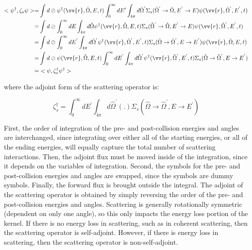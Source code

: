 \documentclass[10pt]{article}
\begin{document}
\begin{flushleft}
\begin{enumerate}
\begin{equation}
\begin{aligned}
<\psi^\dagger,\zeta_s\psi>=& \int d\oslash\psi^\dagger(\vv{r},\hat{\Omega},E,t)\int_0^\infty dE'\int_{4\pi}d\hat{\Omega}^{'}\Sigma_s(\hat{\Omega}^{'}\rightarrow\hat{\Omega}, E^{'}\rightarrow E)\psi(\vv{r},\hat{\Omega}^{'},E^{'},t)\\
=& \int d\oslash\int_0^\infty dE\int_{4\pi}d\hat{\Omega}\psi^\dagger(\vv{r},\hat{\Omega},E,t)\Sigma_s(\hat{\Omega}^{'}\rightarrow\hat{\Omega}, E^{'}\rightarrow E)\psi(\vv{r},\hat{\Omega}^{'},E^{'},t)\\
=& \int d\oslash\int_0^\infty dE^{'}\int_{4\pi}d\hat{\Omega}^{'}\psi^\dagger(\vv{r},\hat{\Omega}^{'},E^{'},t)\Sigma_s(\hat{\Omega}\rightarrow\hat{\Omega}^{'}, E\rightarrow E^{'})\psi(\vv{r},\hat{\Omega},E,t)\\
=& \int d\oslash\psi(\vv{r},\hat{\Omega},E,t)\int_0^\infty dE^{'}\int_{4\pi}d\hat{\Omega}^{'}\psi^\dagger(\vv{r},\hat{\Omega}^{'},E^{'},t)\Sigma_s(\hat{\Omega}\rightarrow\hat{\Omega}^{'}, E\rightarrow E^{'})\\
=& <\psi, \zeta_s^\dagger\psi^\dagger>
\end{aligned}
\end{equation}

where the adjoint form of the scattering operator is:

\begin{equation}
\zeta_s^\dagger= \int_0^\infty dE^{'}\int_{4\pi}d\hat{\Omega}^{'}(.)\Sigma_s(\hat{\Omega}\rightarrow\hat{\Omega}^{'}, E\rightarrow E^{'})
\end{equation}

First, the order of integration of the pre- and post-collision energies and angles are interchanged, since integrating over either all of the starting energies, or all of the ending energies, will equally capture the total number of scattering interactions. Then, the adjoint flux must be moved inside of the integration, since it depends on the variables of integration. Second, the symbols for the pre- and post-collision energies and angles are swapped, since the symbols are dummy symbols. Finally, the forward flux is brought outside the integral. The adjoint of the scattering operator is obtained by simply reversing the order of the pre- and post-collision energies and angles. Scattering is generally rotationally symmetric (dependent on only one angle), so this only impacts the energy loss portion of the kernel. If there is no energy loss in scattering, such as in coherent scattering, then the scattering operator is self-adjoint. However, if there is energy loss in scattering, then the scattering operator is non-self-adjoint.


\end{enumerate}
\end{flushleft}
\end{document}
